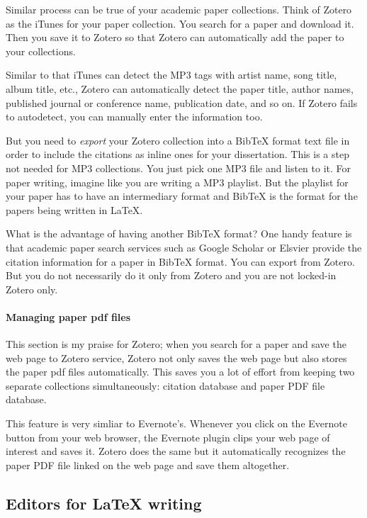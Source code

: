 \documentclass[11pt]{article}
\begin{document}
Similar process can be true of your academic paper collections. Think of
Zotero as the iTunes for your paper collection. You search for a paper and
download it. Then you save it to Zotero so that Zotero can automatically add
the paper to your collections. 

Similar to that iTunes can detect the MP3 tags with artist name, song
title, album title, etc., Zotero can automatically detect the paper
title, author names, published journal or conference name, publication
date, and so on. If Zotero fails to autodetect, you can manually enter
the information too.

But you need to \emph{export} your Zotero collection into a BibTeX format
text file in order to include the citations as inline ones for your
dissertation. This is a step not needed for MP3 collections. You just pick one
MP3 file and listen to it. For paper writing, imagine like you are writing a
MP3 playlist. But the playlist for your paper has to have an intermediary
format and BibTeX is the format for the papers being written in LaTeX.

What is the advantage of having another BibTeX format? One handy feature is
that academic paper search services such as Google Scholar or Elsvier provide
the citation information for a paper in BibTeX format. You can export from
Zotero. But you do not necessarily do it only from Zotero and you are not
locked-in Zotero only. 

\paragraph{Managing paper pdf files}
This section is my praise for Zotero; when you search for a paper and
save the web page to Zotero service, Zotero not only saves the web page
but also stores the paper pdf files automatically. This saves you a lot
of effort from keeping two separate collections simultaneously: citation
database and paper PDF file database.

This feature is very simliar to Evernote's. Whenever you click on the Evernote
button from your web browser, the Evernote plugin clips your web page of
interest and saves it. Zotero does the same but it automatically recognizes
the paper PDF file linked on the web page and save them altogether.

\subsection{Editors for LaTeX writing}
\end{document}

